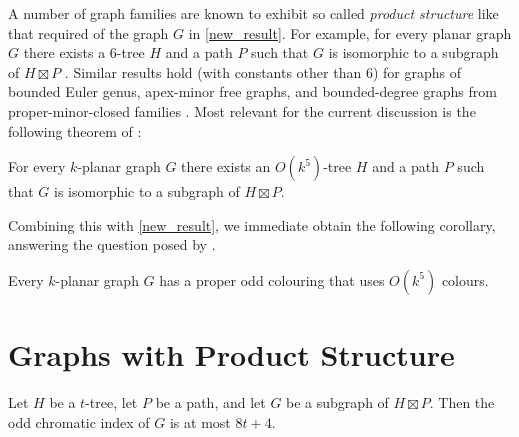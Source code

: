 \documentclass{patmorin}
\begin{document}
A number of graph families are known to exhibit so called \emph{product structure} like that required of the graph $G$ in \cref{new_result}.  For example, for every planar graph $G$ there exists a $6$-tree $H$ and a path $P$ such that $G$ is isomorphic to a subgraph of $H\boxtimes P$ \cite{ueckerdt.wood.ea:improved}.  Similar results hold (with constants other than $6$) for graphs of bounded Euler genus, apex-minor free graphs, and bounded-degree graphs from proper-minor-closed families \cite{dujmovic.joret.ea:planar,dujmovic.esperet.ea:clustered}.  Most relevant for the current discussion is the following theorem of \citet{dujmovic.morin.ea:structure}:

\begin{thm}\label{k_planar}
  For every $k$-planar graph $G$ there exists an $O(k^5)$-tree $H$ and a path $P$ such that $G$ is isomorphic to a subgraph of $H\boxtimes P$.
\end{thm}

Combining this with \cref{new_result}, we immediate obtain the following corollary, answering the question posed by \citet{cranston.lafferty.ea:note}.

\begin{cor}
  Every $k$-planar graph $G$ has a proper odd colouring that uses $O(k^5)$ colours.
\end{cor}

\section{Graphs with Product Structure}

\begin{thm}\label{new_result}
  Let $H$ be a $t$-tree, let $P$ be a path, and let $G$ be a subgraph of $H\boxtimes P$. Then the odd chromatic index of $G$ is at most $8t+4$.
\end{thm}
\end{document}
